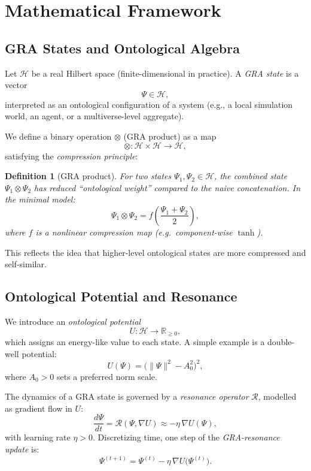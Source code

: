 \documentclass[11pt,a4paper]{article}
\newtheorem{definition}{Definition}
\begin{document}
\section{Mathematical Framework}

\subsection{GRA States and Ontological Algebra}
Let $\mathcal{H}$ be a real Hilbert space (finite-dimensional in practice).
A \emph{GRA state} is a vector
\[
  \Psi \in \mathcal{H},
\]
interpreted as an ontological configuration of a system
(e.g., a local simulation world, an agent, or a multiverse-level aggregate).

We define a binary operation $\otimes$ (GRA product) as a map
\[
  \otimes: \mathcal{H} \times \mathcal{H} \to \mathcal{H},
\]
satisfying the \emph{compression principle}:
\begin{definition}[GRA product]
For two states $\Psi_1, \Psi_2 \in \mathcal{H}$,
the combined state $\Psi_1 \otimes \Psi_2$ has reduced
``ontological weight'' compared to the naive concatenation.
In the minimal model:
\[
  \Psi_1 \otimes \Psi_2
  = f\!\left(\frac{\Psi_1 + \Psi_2}{2}\right),
\]
where $f$ is a nonlinear compression map (e.g.\ component-wise $\tanh$).
\end{definition}
This reflects the idea that higher-level ontological states
are more compressed and self-similar.

\subsection{Ontological Potential and Resonance}
We introduce an \emph{ontological potential}
\[
  U: \mathcal{H} \to \mathbb{R}_{\ge 0},
\]
which assigns an energy-like value to each state.
A simple example is a double-well potential:
\begin{equation}
  U(\Psi) = \bigl(\|\Psi\|^2 - A_0^2\bigr)^2,
  \label{eq:double-well}
\end{equation}
where $A_0 > 0$ sets a preferred norm scale.

The dynamics of a GRA state is governed by a \emph{resonance operator}
$\mathcal{R}$, modelled as gradient flow in $U$:
\begin{equation}
  \frac{d\Psi}{dt}
  = \mathcal{R}(\Psi, \nabla U)
  \approx -\eta \, \nabla U(\Psi),
  \label{eq:resonance}
\end{equation}
with learning rate $\eta > 0$.
Discretizing time, one step of the \emph{GRA-resonance update} is:
\begin{equation}
  \Psi^{(t+1)} = \Psi^{(t)} - \eta \, \nabla U\bigl(\Psi^{(t)}\bigr).
  \label{eq:discrete-resonance}
\end{equation}
\end{document}
